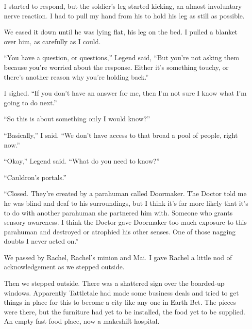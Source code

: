 I started to respond, but the soldier's leg started kicking, an almost involuntary nerve reaction.  I had to pull my hand from his to hold his leg as still as possible.



We eased it down until he was lying flat, his leg on the bed.  I pulled a blanket over him, as carefully as I could.



``You have a question, or questions,'' Legend said, ``But you're not asking them because you're worried about the response.  Either it's something touchy, or there's another reason why you're holding back.''



I sighed.  ``If you don't have an answer for me, then I'm not sure I know what I'm going to do next.''



``So this is about something only I would know?''



``Basically,'' I said.  ``We don't have access to that broad a pool of people, right now.''



``Okay,'' Legend said.  ``What do you need to know?''



``Cauldron's portals.''



``Closed.  They're created by a parahuman called Doormaker.  The Doctor told me he was blind and deaf to his surroundings, but I think it's far more likely that it's to do with another parahuman she partnered him with.  Someone who grants sensory awareness.  I think the Doctor gave Doormaker too much exposure to this parahuman and destroyed or atrophied his other senses.  One of those nagging doubts I never acted on.''



We passed by Rachel, Rachel's minion and Mai.  I gave Rachel a little nod of acknowledgement as we stepped outside.



Then we stepped outside.  There was a shattered sign over the boarded-up windows.  Apparently Tattletale had made some business deals and tried to get things in place for this to become a city like any one in Earth Bet.  The pieces were there, but the furniture had yet to be installed, the food yet to be supplied.  An empty fast food place, now a makeshift hospital.



